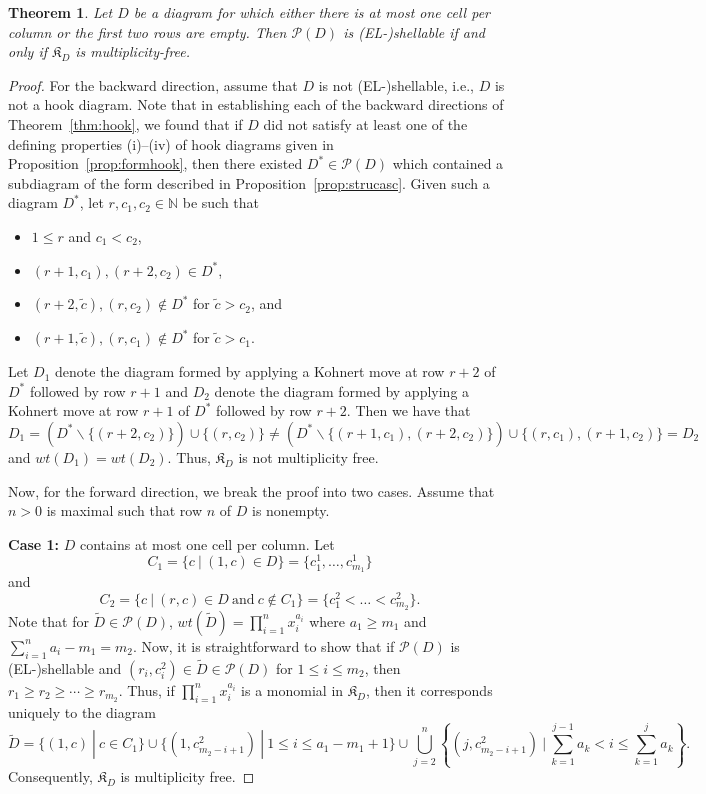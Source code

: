 \documentclass[letterpaper,10pt]{article}
\newtheorem{theorem}{Theorem}
\begin{document}
\begin{theorem}\label{thm:hookmf}
    Let $D$ be a diagram for which either there is at most one cell per column or the first two rows are empty. Then $\mathcal{P}(D)$ is \textup(EL-\textup)shellable if and only if $\mathfrak{K}_D$ is multiplicity-free.
\end{theorem}
\begin{proof}
    For the backward direction, assume that $D$ is not (EL-)shellable, i.e., $D$ is not a hook diagram. Note that in establishing each of the backward directions of Theorem~\ref{thm:hook}, we found that if $D$ did not satisfy at least one of the defining properties (i)--(iv) of hook diagrams given in Proposition~\ref{prop:formhook}, then there existed $D^*\in \mathcal{P}(D)$ which contained a subdiagram of the form described in Proposition~\ref{prop:strucasc}. Given such a diagram $D^*$, let $r,c_1,c_2\in\mathbb{N}$ be such that 
    \begin{itemize}
        \item[\textup{(i)}] $1\le r$ and $c_1<c_2$,
        \item[\textup{(ii)}] $(r+1,c_1),(r+2,c_2)\in D^*$,
        \item[\textup{(iii)}] $(r+2,\tilde{c}),(r,c_2)\notin D^*$ for $\tilde{c}>c_2$, and
        \item[\textup{(iv)}] $(r+1,\tilde{c}),(r,c_1)\notin D^*$ for $\tilde{c}>c_1$.
    \end{itemize} 
    Let $D_1$ denote the diagram formed by applying a Kohnert move at row $r+2$ of $D^*$ followed by row $r+1$ and $D_2$ denote the diagram formed by applying a Kohnert move at row $r+1$ of $D^*$ followed by row $r+2$. Then we have that $$D_1=(D^*\backslash\{(r+2,c_2)\})\cup\{(r,c_2)\}\neq (D^*\backslash\{(r+1,c_1),(r+2,c_2)\})\cup\{(r,c_1),(r+1,c_2)\}=D_2$$ and $wt(D_1)=wt(D_2)$. Thus, $\mathfrak{K}_D$ is not multiplicity free.

    Now, for the forward direction, we break the proof into two cases. Assume that $n>0$ is maximal such that row $n$ of $D$ is nonempty.
    \bigskip

    \noindent
    \textbf{Case 1:} $D$ contains at most one cell per column. Let $$C_1=\{c~|~(1,c)\in D\}=\{c^1_1,\hdots,c^1_{m_1}\}$$ and $$C_2=\{c~|~(r,c)\in D~\text{and}~c\notin C_1\}=\{c^2_1<\hdots<c^2_{m_2}\}.$$ Note that for $\tilde{D}\in \mathcal{P}(D)$, $wt(\tilde{D})=\prod_{i=1}^nx_i^{a_i}$ where $a_1\ge m_1$ and $\sum_{i=1}^na_i-m_1=m_2$. Now, it is straightforward to show that if $\mathcal{P}(D)$ is (EL-)shellable and $(r_i,c^2_i)\in\tilde{D}\in \mathcal{P}(D)$ for $1\le i\le m_2$, then $r_1\ge r_2\ge\cdots\ge r_{m_2}$. Thus, if $\prod_{i=1}^nx_i^{a_i}$ is a monomial in $\mathfrak{K}_D$, then it corresponds uniquely to the diagram $$\tilde{D}=\{(1,c)~|~c\in C_1\}\cup\{(1,c^2_{m_2-i+1})~|~1\le i\le a_1-m_1+1\}\cup\bigcup_{j=2}^n\left\{(j,c^2_{m_2-i+1})~|~\sum_{k=1}^{j-1}a_k< i\le\sum_{k=1}^{j}a_k\right\}.$$ Consequently, $\mathfrak{K}_D$ is multiplicity free.
    \bigskip


\end{proof}
\end{document}

